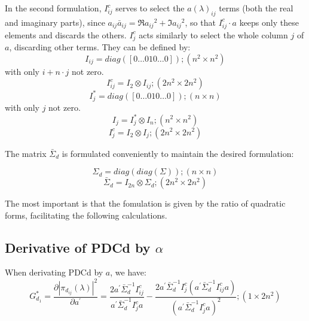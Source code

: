 \documentclass[a4paper,10pt]{article}
\begin{document}
In the second formulation, $I_{ij}^{c}$ serves to select the $a(\lambda)_{ij}$ terms (both the real and imaginary parts), since $a_{ij} \bar {a}_{ij} = \Re{a_{ij}}^2 + \Im{a_{ij}}^2$, so that $I_{ij}^{c} \cdot a$ keeps only these elements and discards the others. $I_{j}^{c}$ acts similarly to select the whole column $j$ of $a$, discarding other terms. They can be defined by:
\begin{equation}
I_{ij} = diag(\left[ 0 \dots 0 1 0 \dots 0 \right]); (n^{2} \times n^{2})
\end{equation} 
with only $i+n\cdot j$ not zero.
\begin{equation}
I_{ij}^{c} = I_{2} \otimes I_{ij}; (2n^{2} \times 2n^{2}) 
\end{equation}
\begin{equation}
I_{j}^{\ast} = diag([0 \dots 0 1 0 \dots 0]); (n \times n)
\end{equation}
with only $j$ not zero.
\begin{equation}
I_{j} = I_{j}^{\ast} \otimes I_{n}; (n^{2} \times n^{2})
\end{equation}
\begin{equation}
I_{j}^{c} = I_{2} \otimes I_{j}; (2n^{2} \times 2n^{2})
\end{equation}

The matrix $\bar{\Sigma}_{d}$ is formulated conveniently to maintain the desired formulation:

\begin{equation}
\Sigma_{d} = diag(diag(\Sigma)); (n \times n)
\end{equation}
\begin{equation}
\bar{\Sigma}_{d} = I_{2n} \otimes \Sigma_{d}; (2n^{2} \times 2n^{2})
\end{equation}

The most important is that the fomulation is given by the ratio of quadratic forms, facilitating the following calculations.

\subsection{Derivative of PDCd by $\alpha$}

When derivating PDCd by $a$, we have:
\begin{equation}
G_{d_1}^{\ast} = \frac{\partial |\pi_{d_{ij}}(\lambda)|^{2}}{\partial a^{'}} = \frac{2 a^{'} \bar{\Sigma}_{d}^{-1} I_{ij}^{c}} {a^{'} \bar{\Sigma}_{d}^{-1} I_{j}^{c} a} - \frac{2 a^{'} \bar{\Sigma}_{d}^{-1} I_{j}^{c} (a^{'} \bar{\Sigma}_{d}^{-1} I_{ij}^{c} a)} {(a^{'} \bar{\Sigma}_{d}^{-1} I_{j}^{c} a)^{2}}; (1 \times 2n^{2})
\end{equation}
\end{document}
